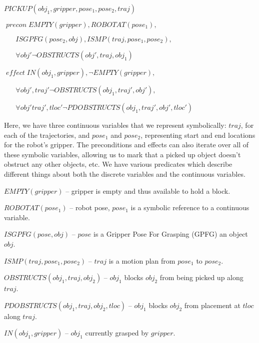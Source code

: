 \documentclass[12pt]{article}
\begin{document}
\vspace{10pt}

$PICKUP(obj_1, gripper, pose_1, pose_2, traj)$

$\; precon \; EMPTY(gripper), ROBOTAT(pose_1), $

$\; \; \;\; \; \; ISGPFG(pose_2, obj), ISMP(traj, pose_1, pose_2), $

$\; \; \; \; \; \;\forall obj' \neg OBSTRUCTS(obj', traj, obj_1)$

$\; effect \; IN(obj_1, gripper), \neg EMPTY(gripper), $

$\; \; \;\; \; \; \forall obj', traj' \neg OBSTRUCTS(obj_1, traj', obj'), $

$\; \; \; \; \; \;\forall obj' traj', tloc' \neg PDOBSTRUCTS(obj_1, traj', obj', tloc')$

\vspace{10pt}

Here, we have three continuous variables that we represent symbolically: $traj$, for each of the trajectories, and $pose_1$ and $pose_2$, representing start and end locations for the robot's gripper.
The preconditions and effects can also iterate over all of these symbolic variables, allowing us to mark that a picked up object doesn't obstruct any other objects, etc. 
We have various predicates which describe different things about both the discrete variables and the continuous variables.

\vspace{10pt}

$EMPTY(gripper)$ -- gripper is empty and thus available to hold a block.

$ROBOTAT(pose_1)$ -- robot pose,  $pose_1$ is a symbolic reference to a continuous variable.

$ISGPFG(pose, obj)$ -- $pose$ is a Gripper Pose For Grasping (GPFG) an object $obj$.

$ISMP(traj, pose_1, pose_2)$ -- $traj$ is a motion plan from $pose_1$ to $pose_2$.

$OBSTRUCTS(obj_1, traj, obj_2)$ -- $obj_1$ blocks $obj_2$ from being picked up along $traj$.

$PDOBSTRUCTS(obj_1, traj, obj_2, tloc)$ -- $obj_1$ blocks $obj_2$ from placement at $tloc$ along $traj$.

$IN(obj_1, gripper)$ -- $obj_1$ currently grasped by $gripper$.

\vspace{10pt}
\end{document}

